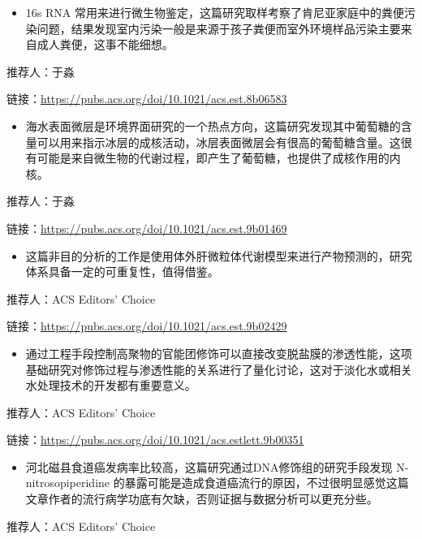 \documentclass[
]{book}
\providecommand{\tightlist}{%
  \setlength{\itemsep}{0pt}\setlength{\parskip}{0pt}}
\begin{document}
\begin{itemize}
\tightlist
\item
  16s RNA 常用来进行微生物鉴定，这篇研究取样考察了肯尼亚家庭中的粪便污染问题，结果发现室内污染一般是来源于孩子粪便而室外环境样品污染主要来自成人粪便，这事不能细想。
\end{itemize}

推荐人：于淼

链接：\url{https://pubs.acs.org/doi/10.1021/acs.est.8b06583}

\begin{itemize}
\tightlist
\item
  海水表面微层是环境界面研究的一个热点方向，这篇研究发现其中葡萄糖的含量可以用来指示冰层的成核活动，冰层表面微层会有很高的葡萄糖含量。这很有可能是来自微生物的代谢过程，即产生了葡萄糖，也提供了成核作用的内核。
\end{itemize}

推荐人：于淼

链接：\url{https://pubs.acs.org/doi/10.1021/acs.est.9b01469}

\begin{itemize}
\tightlist
\item
  这篇非目的分析的工作是使用体外肝微粒体代谢模型来进行产物预测的，研究体系具备一定的可重复性，值得借鉴。
\end{itemize}

推荐人：ACS Editors' Choice

链接：\url{https://pubs.acs.org/doi/10.1021/acs.est.9b02429}

\begin{itemize}
\tightlist
\item
  通过工程手段控制高聚物的官能团修饰可以直接改变脱盐膜的渗透性能，这项基础研究对修饰过程与渗透性能的关系进行了量化讨论，这对于淡化水或相关水处理技术的开发都有重要意义。
\end{itemize}

推荐人：ACS Editors' Choice

链接：\url{https://pubs.acs.org/doi/10.1021/acs.estlett.9b00351}

\begin{itemize}
\tightlist
\item
  河北磁县食道癌发病率比较高，这篇研究通过DNA修饰组的研究手段发现 N-nitrosopiperidine 的暴露可能是造成食道癌流行的原因，不过很明显感觉这篇文章作者的流行病学功底有欠缺，否则证据与数据分析可以更充分些。
\end{itemize}

推荐人：ACS Editors' Choice
\end{document}

